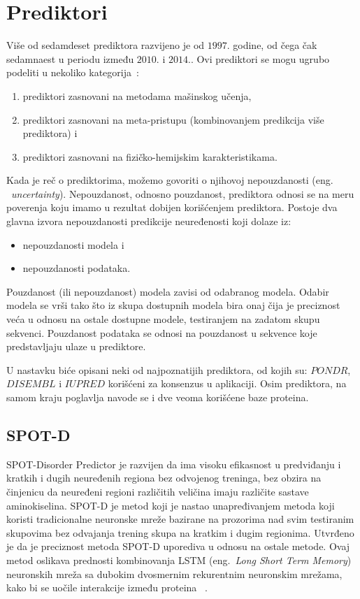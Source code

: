 \section{Prediktori}

Više od sedamdeset prediktora razvijeno je od $1997.$ godine, od čega čak sedamnaest u periodu između $2010.$ i $2014.$. Ovi prediktori se mogu ugrubo podeliti u nekoliko kategorija~\cite{PredictorsOverview}:
\begin{enumerate}
\item prediktori zasnovani na metodama mašinskog učenja,
\item prediktori zasnovani na meta-pristupu (kombinovanjem predikcija više prediktora) i 
\item prediktori zasnovani na fizičko-hemijskim karakteristikama.
\end{enumerate}

Kada je reč o prediktorima, možemo govoriti o njihovoj nepouzdanosti (eng. ~{\em  uncertainty}). Nepouzdanost, odnosno pouzdanost, prediktora odnosi se na meru poverenja koju imamo u rezultat dobijen korišćenjem prediktora. Postoje dva glavna izvora nepouzdanosti predikcije neuređenosti koji dolaze iz:
\begin{itemize}
\item nepouzdanosti modela i
\item nepouzdanosti podataka.
\end{itemize}

Pouzdanost (ili nepouzdanost) modela zavisi od odabranog modela. Odabir modela se vrši tako što iz skupa dostupnih modela bira onaj čija je preciznost veća u odnosu na ostale dostupne modele, testiranjem na zadatom skupu sekvenci. Pouzdanost podataka se odnosi na pouzdanost u sekvence koje predstavljaju ulaze u prediktore.~\cite{MolBioSyst}

U nastavku biće opisani neki od najpoznatijih prediktora, od kojih su:  $PONDR$, $DISEMBL$ i $IUPRED$ korišćeni za konsenzus u aplikaciji. Osim prediktora, na samom kraju poglavlja navode se i dve veoma korišćene baze proteina.


\subsection{SPOT-D}

SPOT-Disorder Predictor je razvijen da ima visoku efikasnost u predviđanju i kratkih i dugih neuređenih regiona bez odvojenog treninga, bez obzira na činjenicu da neuređeni regioni različitih veličina imaju različite sastave aminokiselina. SPOT-D je metod koji je nastao unapređivanjem metoda koji koristi tradicionalne neuronske mreže bazirane na prozorima nad svim testiranim skupovima bez odvajanja trening skupa na kratkim i dugim regionima. Utvrđeno je da je preciznost metoda SPOT-D uporediva u odnosu na ostale metode. Ovaj metod oslikava prednosti kombinovanja LSTM (eng.~{\em Long Short Term Memory}) neuronskih mreža sa dubokim dvosmernim rekurentnim neuronskim mrežama, kako bi se uočile interakcije između proteina
~\cite{SPOTD}.
